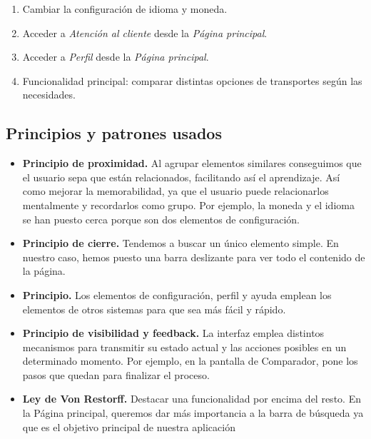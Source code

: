 \begin{enumerate}

      \item Cambiar la configuración de idioma y moneda.
      \item Acceder a \textit{Atención al cliente} desde la \textit{Página principal}.
      \item Acceder a \textit{Perfil} desde la \textit{Página principal}.
      \item Funcionalidad principal: comparar distintas opciones de transportes según las
            necesidades.

\end{enumerate}

\subsection{Principios y patrones usados}

\begin{itemize}

      \item \textbf{Principio de proximidad.} Al agrupar elementos similares conseguimos que el usuario sepa que están relacionados, facilitando así el aprendizaje. Así como mejorar la memorabilidad, ya que el usuario puede relacionarlos mentalmente y recordarlos como grupo.
            Por ejemplo, la moneda y el idioma se han puesto cerca porque son dos elementos de configuración.
      \item \textbf{Principio de cierre.} Tendemos a buscar un único elemento simple.
            En nuestro caso, hemos puesto una barra deslizante para ver todo el contenido de la página.
      \item \textbf{Principio.} Los elementos de configuración, perfil y ayuda emplean los elementos de otros sistemas para que sea más fácil y rápido.
      \item \textbf{Principio de visibilidad y feedback.} La interfaz emplea distintos mecanismos para transmitir su estado actual y las acciones posibles en un determinado momento.
            Por ejemplo, en la pantalla de Comparador, pone los pasos que quedan para finalizar el proceso.
      \item \textbf{Ley de Von Restorff.} Destacar una funcionalidad por encima del resto.
            En la Página principal, queremos dar más importancia a la barra de búsqueda ya que es el objetivo principal de nuestra aplicación

\end{itemize}

